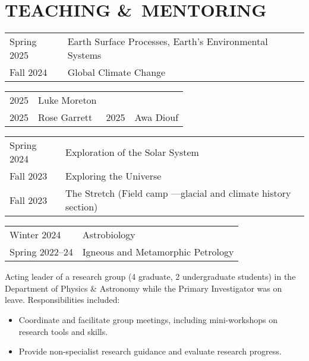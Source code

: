 \section{TEACHING \&\ MENTORING}
\begin{tabular}{p{.15\linewidth} l} %
	Spring 2025\ongoing & Earth Surface Processes, Earth's Environmental Systems\\
	Fall 2024\ongoing & Global Climate Change
\end{tabular}

\begin{tabular}{ll|ll}
	2025\ongoing & Luke Moreton
	\\
	2025\ongoing & Rose Garrett
	&
	2025\ongoing & Awa Diouf
\end{tabular}

\begin{tabular}{p{.15\linewidth} l}
	Spring 2024 & Exploration of the Solar System \\
	Fall 2023 & Exploring the Universe \\
	Fall 2023 & The Stretch \normalfont (Field camp ---glacial and climate history section)
\end{tabular}

\begin{tabular}{p{.15\linewidth} l} %
	Winter 2024 & Astrobiology\\
	Spring 2022--24 & Igneous and Metamorphic Petrology
\end{tabular}

Acting leader of a research group (4 graduate, 2 undergraduate students) in the Department of Physics \& Astronomy while the Primary Investigator was on leave. Responsibilities included:
\begin{itemize}[itemsep=0pt]
\item Coordinate and facilitate group meetings, including mini-workshops on research tools and skills.
\item Provide non-specialist research guidance and evaluate research progress.
\end{itemize}

